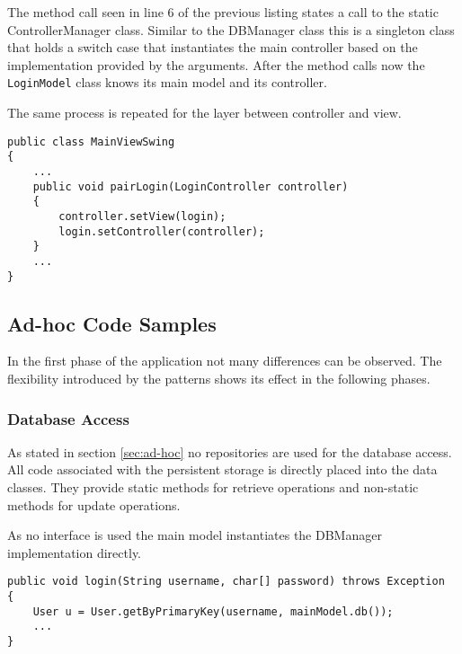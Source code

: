 The method call seen in line 6 of the previous listing states a call to the static ControllerManager class. Similar to the DBManager class this is a singleton class that holds a switch case that instantiates the main controller based on the implementation provided by the arguments. After the method calls now the \texttt{LoginModel} class knows its main model and its controller. 

The same process is repeated for the layer between controller and view. 

\begin{lstlisting}[caption={Code snipped showing pairing code between a sub-controller and a sub-view. The pairing between the model and controller layer works in a very similar way.}, captionpos=b, label={lst:pairing}]
public class MainViewSwing
{
	...
	public void pairLogin(LoginController controller)
	{
		controller.setView(login);
		login.setController(controller);
	}
	...
}
\end{lstlisting}
   

\subsection{Ad-hoc Code Samples}
In the first phase of the application not many differences can be observed. The flexibility introduced by the patterns shows its effect in the following phases. 

\subsubsection{Database Access}
As stated in section \ref{sec:ad-hoc} no repositories are used for the database access. All code associated with the persistent storage is directly placed into the data classes. They provide static methods for retrieve operations and non-static methods for update operations. 

As no interface is used the main model instantiates the DBManager implementation directly. 

\begin{lstlisting}[caption={Code snipped showing database access in the ad-hoc program version. Database code is placed into the corresponding data class. Retrieval methods are static and take the corresponding DBManager as parameter. The reference to the DBManager is provided by a getter method of the main model, as in listing \ref{lst:db-access-bp}.}, captionpos=b]
public void login(String username, char[] password) throws Exception
{
	User u = User.getByPrimaryKey(username, mainModel.db());
	...
}
\end{lstlisting}

